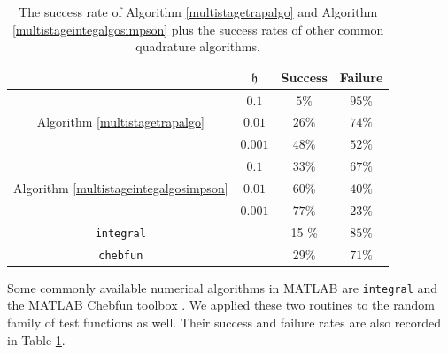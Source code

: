 \documentclass{iitthesis}
\theoremstyle{definition}
\theoremstyle{remark}
\begin{document}
\begin{table}[h]\label{integresultstable}
\centering
\begin{tabular}{cccc}
& $\mathfrak{h}$ & Success & Failure \\
\toprule
&$0.1$  & $5\%$ &  $95\%$  \\
Algorithm \ref{multistagetrapalgo}
 &$0.01$  & $26\%$ & $74\%$ \\
&$0.001$ & $48\%$ &$52\%$ \\
\midrule
&$0.1$  & $33\%$ &  $67\%$  \\
Algorithm \ref{multistageintegalgosimpson}
 &$0.01$  & $60\%$ & $40\%$ \\
&$0.001$ & $77\%$ &$23\%$ \\
\midrule
{\tt integral} & & 15 \% & $85\%$\\
{\tt chebfun} & &29\% & $71\%$\\
\end{tabular}
\caption{The success rate of Algorithm \ref{multistagetrapalgo} and Algorithm \ref{multistageintegalgosimpson} plus the success rates of other common quadrature algorithms.}
\end{table}

Some commonly available numerical algorithms in MATLAB are {\tt integral} \cite{MAT8.1} and the MATLAB Chebfun toolbox \cite{TrefEtal12}. We applied these two routines to the random family of test functions as well.  Their success and failure rates are also recorded in Table \ref{integresultstable}.  %
\end{document}
